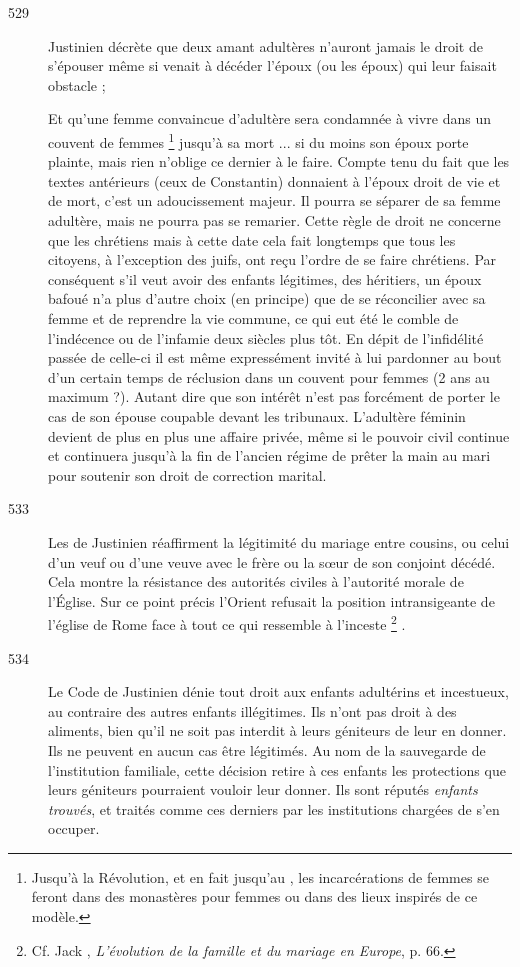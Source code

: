 \begin{description}
\item[529] Justinien décrète que deux amant adultères n'auront jamais le droit de s'épouser même si venait à décéder l'époux (ou les époux) qui leur faisait obstacle ;

Et qu'une femme convaincue d'adultère sera condamnée à vivre dans un couvent de femmes%
\footnote{Jusqu'à la Révolution, et en fait jusqu'au , les incarcérations de femmes se feront dans des monastères pour femmes ou dans des lieux inspirés de ce modèle.} 
jusqu'à sa mort ... si du moins son époux porte plainte, mais rien n'oblige ce dernier à le faire. Compte tenu du fait que les textes antérieurs (ceux de Constantin) donnaient à l'époux droit de vie et de mort, c'est un adoucissement majeur. Il pourra se séparer de sa femme adultère, mais ne pourra pas se remarier. Cette règle de droit ne concerne que les chrétiens mais à cette date cela fait longtemps que tous les citoyens, à l'exception des juifs, ont reçu l'ordre de se faire chrétiens. Par conséquent s'il veut avoir des enfants légitimes, des héritiers, un époux bafoué n'a plus d'autre choix (en principe) que de se réconcilier avec sa femme et de reprendre la vie commune, ce qui eut été le comble de l'indécence ou de l'infamie deux siècles plus tôt. En dépit de l'infidélité passée de celle-ci il est même expressément invité à lui pardonner au bout d'un certain temps de réclusion dans un couvent pour femmes (2 ans au maximum ?). Autant dire que son intérêt n'est pas forcément de porter le cas de son épouse coupable devant les tribunaux. L'adultère féminin devient de plus en plus une affaire privée, même si le pouvoir civil continue et continuera jusqu'à la fin de l'ancien régime de prêter la main au mari pour soutenir son droit de correction marital. 

\item[533] Les  de Justinien réaffirment la légitimité du mariage entre cousins, ou celui d'un veuf ou d'une veuve avec le frère ou la sœur de son conjoint décédé. Cela montre la résistance des autorités civiles à l'autorité morale de l'Église. Sur ce point précis l'Orient refusait la position intransigeante de l'église de Rome face à tout ce qui ressemble à l'inceste%
\footnote{Cf. Jack , \emph{L'évolution de la famille et du mariage en Europe}, p. 66.}%
.

\item[534] Le Code de Justinien dénie tout droit aux enfants adultérins et incestueux, au contraire des autres enfants illégitimes. Ils n'ont pas droit à des aliments, bien qu'il ne soit pas interdit à leurs
géniteurs de leur en donner. Ils ne peuvent en aucun cas être légitimés. Au nom de la sauvegarde de l'institution familiale, cette décision retire à ces enfants les protections que leurs géniteurs pourraient vouloir leur donner. Ils sont réputés \emph{enfants trouvés}, et traités comme ces derniers par les institutions chargées de s'en occuper. 


\end{description}

